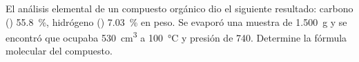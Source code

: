 El análisis elemental de un compuesto orgánico dio el siguiente resultado: carbono () \SI{55,8}{\percent}, hidrógeno () \SI{7,03}{\percent} en peso. Se evaporó una muestra de \SI{1,500}{\gram} y se encontró que ocupaba \SI{530}{\cubic\centi\meter} a \SI{100}{\celsius} y presión de \SI{740}{\torr}. Determine la fórmula molecular del compuesto.
